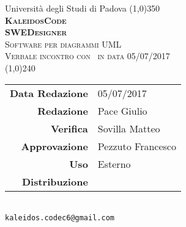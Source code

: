 \documentclass[a4paper,12pt]{article}
\author{KaleidosCode}
\date{05/05/2017}
\begin{document}
	\begin{titlepage}
		\centering Università degli Studi di Padova
		\line(1,0){350}\\
		\vspace{0.4cm}
		{\bfseries\scshape\LARGE KaleidosCode\\}
		\vspace{0.4cm}
		{\bfseries\scshape\LARGE SWEDesigner\\}
		{\scshape\Large Software per diagrammi UML\\}
		\vspace{1cm}
		{\scshape\Large Verbale incontro con \proponente\ in data 05/07/2017 \\}		%
		\vspace{1.4cm}
		\logo
		\vspace{1.2cm}
		\line(1,0){240}\\
		\begin{tabular}{r|l}
			{\hfill \textbf{Data Redazione}} 	& 05/07/2017\\	%
			{\hfill \textbf{Redazione}} 		& Pace Giulio\\
			{\hfill \textbf{Verifica}} 			& Sovilla Matteo\\
			{\hfill \textbf{Approvazione}} 		& Pezzuto Francesco\\
			{\hfill \textbf{Uso}} 				& Esterno\\
			{\hfill \textbf{Distribuzione}} 	& \kaleidoscode\\
		\end{tabular}\\
		\vspace{2cm}
		\texttt{kaleidos.codec6@gmail.com}
	\end{titlepage}

	\pagestyle{mymain}
	\newpage
		
		
	\label{LastPage}
\end{document}

